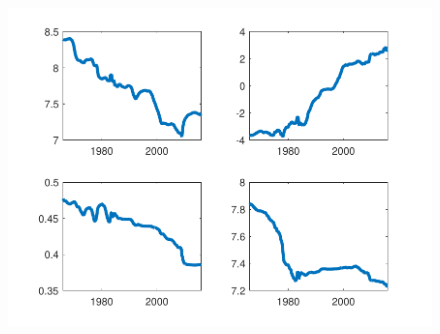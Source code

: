 \documentclass[12pt,reqno]{article}
\numberwithin{equation}{section}
\begin{document}
\begin{figure}[H]
\includegraphics[scale=0.35]{NKPC_ree_init_MSV_shockCoef.pdf}\\

\end{figure}
\end{document}
